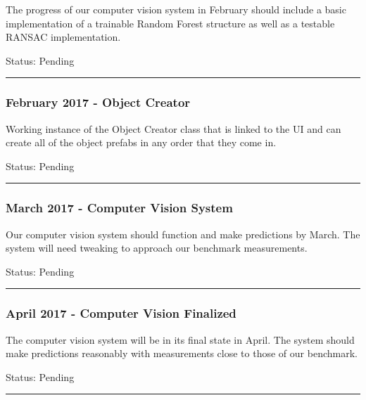 \documentclass[12pt]{article}
\begin{document}
The progress of our computer vision system in February should include a
basic implementation of a trainable Random Forest structure as well as a
testable RANSAC implementation.

Status: Pending

\begin{center}\rule{0.5\linewidth}{\linethickness}\end{center}

\subsubsection{February 2017 - Object
Creator}\label{february-2017---object-creator}

Working instance of the Object Creator class that is linked to the UI
and can create all of the object prefabs in any order that they come in.

Status: Pending

\begin{center}\rule{0.5\linewidth}{\linethickness}\end{center}

\subsubsection{March 2017 - Computer Vision
System}\label{march-2017---computer-vision-system}

Our computer vision system should function and make predictions by
March. The system will need tweaking to approach our benchmark
measurements.

Status: Pending

\begin{center}\rule{0.5\linewidth}{\linethickness}\end{center}

\subsubsection{April 2017 - Computer Vision
Finalized}\label{april-2017---computer-vision-finalized}

The computer vision system will be in its final state in April. The
system should make predictions reasonably with measurements close to
those of our benchmark.

Status: Pending

\begin{center}\rule{0.5\linewidth}{\linethickness}\end{center}
\end{document}
